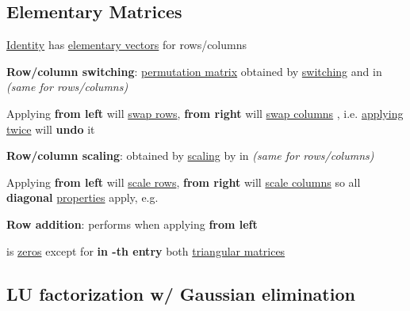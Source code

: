 \subsection*{Elementary Matrices}

\underline{Identity}
has \underline{elementary vectors} 
for rows/columns

\textbf{Row/column switching}: \underline{permutation matrix} 
obtained by \underline{switching}  and
 in  \emph{(same for rows/columns)}
\begin{itemize}

      \vItem
            Applying  \textbf{from left} will \underline{swap rows},
            \textbf{from right} will \underline{swap columns}
      \vItem
            , i.e. \underline{applying twice}
            will \textbf{undo} it
\end{itemize}

\textbf{Row/column scaling}:  obtained by \underline{scaling}  by \iMbox{\lambda} in
 \emph{(same for rows/columns)}
\begin{itemize}
      \vItem
            Applying  \textbf{from left} will \underline{scale rows},
            \textbf{from right} will \underline{scale columns}
      \vItem
            so all \textbf{diagonal} \underline{properties} apply,
            e.g. 
\end{itemize}

\textbf{Row addition}:
performs  when
applying \textbf{from left}
\begin{itemize}

      \vItem
             is \underline{zeros} except
            for \textbf{\iMbox{\lambda} in -th entry}
      \vItem
             both \underline{triangular matrices}
\end{itemize}


\subsection*{LU factorization w/ Gaussian elimination}

